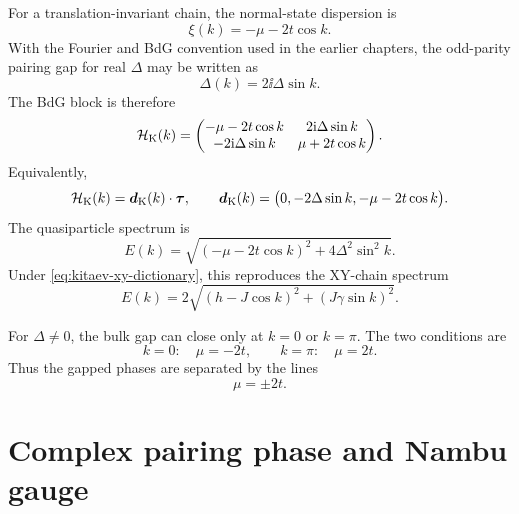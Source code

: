 For a translation-invariant chain, the normal-state dispersion is
\begin{equation}
\label{eq:kitaev-xi-k}
    \xi(k)=-\mu-2t\cos k.
\end{equation}
With the Fourier and BdG convention used in the earlier chapters, the odd-parity
pairing gap for real $\Delta$ may be written as
\begin{equation}
\label{eq:kitaev-gap-real}
    \Delta(k)=2\ii\Delta\sin k.
\end{equation}
The BdG block is therefore
\begin{equation}
\label{eq:kitaev-bdg-block}
    \mathcal{H}_{\rm K}(k)
    =
    \begin{pmatrix}
        -\mu-2t\cos k & 2\mathrm{i}\Delta\sin k\\
        -2\mathrm{i}\Delta\sin k & \mu+2t\cos k
    \end{pmatrix}.
\end{equation}
Equivalently,
\begin{equation}
\label{eq:kitaev-d-vector}
    \mathcal{H}_{\rm K}(k)
    =
    \bm d_{\rm K}(k)\cdot\bm\tau,
    \qquad
    \bm d_{\rm K}(k)
    =
    \bigl(0,-2\Delta\sin k,-\mu-2t\cos k\bigr).
\end{equation}
The quasiparticle spectrum is
\begin{equation}
\label{eq:kitaev-spectrum}
    E(k)
    =
    \sqrt{(-\mu-2t\cos k)^2+4\Delta^2\sin^2 k}.
\end{equation}
Under \cref{eq:kitaev-xy-dictionary}, this reproduces the XY-chain spectrum
\begin{equation}
    E(k)
    =
    2\sqrt{(h-J\cos k)^2+(J\gamma\sin k)^2}.
\end{equation}

For $\Delta\neq0$, the bulk gap can close only at $k=0$ or $k=\pi$.  The two
conditions are
\begin{equation}
\label{eq:kitaev-gap-closing}
    k=0:\quad \mu=-2t,
    \qquad
    k=\pi:
    \quad \mu=2t.
\end{equation}
Thus the gapped phases are separated by the lines
\begin{equation}
\label{eq:kitaev-critical-lines}
    \mu=\pm 2t.
\end{equation}

\section{Complex pairing phase and Nambu gauge}
\label{sec:kitaev-complex-gap-phase}


